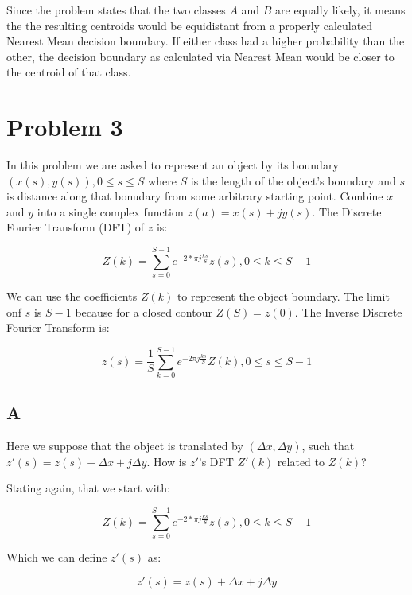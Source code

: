 \documentclass{article}
\begin{document}
Since the problem states that the two classes $A$ and $B$ are equally likely, it means the the resulting centroids would be equidistant from a properly calculated Nearest Mean decision boundary. If either class had a higher probability than the other, the decision boundary as calculated via Nearest Mean would be closer to the centroid of that class.



\section*{Problem 3}

In this problem we are asked to represent an object by its boundary $(x(s),y(s)),0\leq s\leq S$ where $S$ is the length of the object's boundary and $s$ is distance along that bonudary from some arbitrary starting point. Combine $x$ and $y$ into a single complex function $z(a)=x(s)+jy(s)$. The Discrete Fourier Transform (DFT) of $z$ is:

\begin{equation}
    Z(k) = \sum^{S-1}_{s=0} e^{-2*\pi j \frac{ks}{S}} z(s), 0\leq k \leq S-1
\end{equation}

We can use the coefficients $Z(k)$ to represent the object boundary. The limit onf $s$ is $S-1$ because for a closed contour $Z(S)=z(0)$. The Inverse Discrete Fourier Transform is:

\begin{equation}
    z(s) = \frac{1}{S} \sum_{k=0}^{S-1} e^{+2\pi j \frac{ks}{S}} Z(k), 0 \leq s \leq S-1
\end{equation}

\subsection*{A}

Here we suppose that the object is translated by $(\Delta x, \Delta y)$, such that $z'(s) = z(s) + \Delta x + j \Delta y$. How is $z'$'s DFT $Z'(k)$ related to $Z(k)$? 

Stating again, that we start with:

\begin{equation}
    Z(k) = \sum^{S-1}_{s=0} e^{-2*\pi j \frac{ks}{S}} z(s), 0\leq k \leq S-1
\end{equation}

\noindent Which we can define $z'(s)$ as:

\begin{equation}
    z'(s) = z(s) + \Delta x + j \Delta y
\end{equation}
\end{document}
